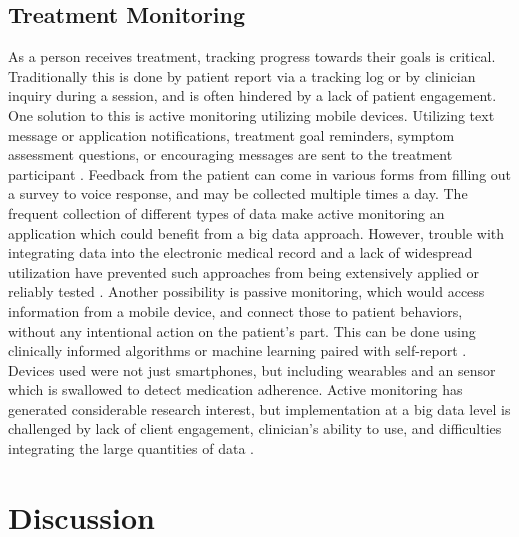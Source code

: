 \documentclass[sigconf]{acmart}
\begin{document}
\subsection{Treatment Monitoring}
As a person receives treatment, tracking progress towards their goals is critical. Traditionally this is done by patient report via a tracking log or by clinician inquiry during a session, and is often hindered by a lack of patient engagement. One solution to this is active monitoring utilizing mobile devices. Utilizing text message or application notifications, treatment goal reminders, symptom assessment questions, or encouraging messages are sent to the treatment participant \cite{bitreview}. Feedback from the patient can come in various forms from filling out a survey  to voice response, and may be collected multiple times a day. The frequent collection of different types of data make active monitoring an application which could benefit from a big data approach. However, trouble with integrating data into the electronic medical record and a lack of widespread utilization have prevented such approaches from being extensively applied or reliably tested \cite{bigdatabipolar}.
Another possibility is passive monitoring, which would access information from a mobile device, and connect those to patient behaviors, without any intentional action on the patient's part. This can be done using clinically informed algorithms or machine learning paired with self-report \cite{bitreview}. Devices used were not just smartphones, but including wearables and an sensor which is swallowed to detect medication adherence. Active monitoring has generated considerable research interest, but implementation at a big data level is challenged by lack of client engagement, clinician's ability to use, and difficulties integrating the large quantities of data \cite{bigdatabipolar}. 
\section{Discussion}
\end{document}
